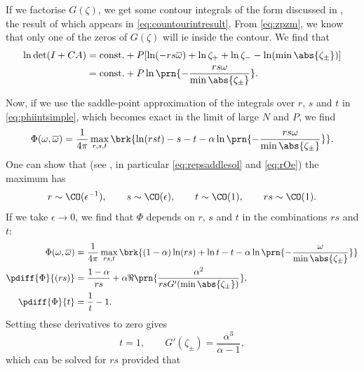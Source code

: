 \documentclass[12pt]{article}
\newcommand{\inv}{^{-1}}
\newcommand{\omb}{\overline{\omega}}
\begin{document}
If we factorise $G(\zeta)$, we get some contour integrals of the form discussed in , the result of which appears in \eqref{eq:countourintresult}.
From \eqref{eq:zpzm}, we know that only one of the zeros of $G(\zeta)$ will ie inside the contour.
We find that
%
\begin{equation}\label{eq:detsimpleresult}
\begin{aligned}
  \ln\det(I+CA) &= \text{const.} + P[\ln(-rs\omb) + \ln\zeta_+ + \ln\zeta_- - \ln(\min\abs{\zeta_\pm})]   \\
   &= \text{const.} + P\ln\prn{-\frac{rs\omega}{\min\abs{\zeta_\pm}}}.
\end{aligned}
\end{equation}
%

Now, if we use the saddle-point approximation of the integrals over $r$, $s$ and $t$ in \eqref{eq:phiintsimple}, which becomes exact in the limit of large $N$ and $P$, we find
%
\begin{equation}\label{eq:phisaddlesimple}
  \Phi(\omega,\omb) = \frac{1}{4\pi} \max_{r,s,t} \brk{ \ln(rst) - s - t -\alpha\ln\prn{-\frac{rs\omega}{\min\abs{\zeta_\pm}}}}.
\end{equation}
%
One can show that (see , in particular \eqref{eq:repsaddlesol} and \eqref{eq:rOe}) the maximum has
%
\begin{equation}\label{eq:saddleOe}
  r \sim \CO(\epsilon\inv),
  \qquad
  s \sim \CO(\epsilon),
  \qquad
  t \sim \CO(1),
  \qquad
  rs \sim \CO(1).
\end{equation}
%
If we take $\epsilon\to0$, we find that $\Phi$ depends on $r$, $s$ and $t$ in the combinations $rs$ and $t$:
%
\begin{equation}\label{eq:phimaxsimple}
\begin{aligned}
  \Phi(\omega,\omb) &= \frac{1}{4\pi} \max_{rs,t} \brk{ (1-\alpha)\ln(rs)+\ln t - t -\alpha\ln\prn{-\frac{\omega}{\min\abs{\zeta_\pm}}}}\\
  \pdiff{\Phi}{(rs)} &= \frac{1-\alpha}{rs} + \alpha\Re\prn{\frac{\alpha^2}{rs G'(\min\abs{\zeta_\pm})}} ,\\
  \pdiff{\Phi}{t}&= \frac{1}{t} - 1 .
\end{aligned}
\end{equation}
%
Setting these derivatives to zero gives
%
\begin{equation}\label{eq:saddlecond}
  t=1,
  \qquad
  G'(\zeta_\pm)=\frac{\alpha^3}{\alpha-1},
\end{equation}
%
which can be solved for $rs$ provided that
\end{document}
